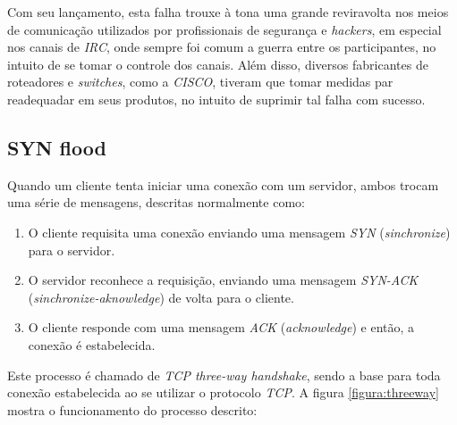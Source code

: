 Com seu lançamento, esta falha trouxe à tona uma grande reviravolta nos meios de comunicação utilizados por profissionais de segurança e \textit{hackers}, em especial nos canais de \textit{IRC}, onde sempre foi comum a guerra entre os participantes, no intuito de se tomar o controle dos canais. Além disso, diversos fabricantes de roteadores e \textit{switches}, como a \textit{CISCO}, tiveram que tomar medidas par readequadar em seus produtos, no intuito de suprimir tal falha com sucesso. \cite{LandExperiences}


\subsection{SYN flood}


Quando um cliente tenta iniciar uma conexão com um servidor, ambos trocam uma série de mensagens, descritas normalmente como:

\begin{enumerate}
    \item O cliente requisita uma conexão enviando uma mensagem \textit{SYN} (\textit{sinchronize}) para o servidor.

    \item O servidor reconhece a requisição, enviando uma mensagem \textit{SYN-ACK} (\textit{sinchronize-aknowledge}) de volta para o cliente.

    \item O cliente responde com uma mensagem \textit{ACK} (\textit{acknowledge}) e então, a conexão é estabelecida.
\end{enumerate}

Este processo é chamado de \textit{TCP three-way handshake}, sendo a base para toda conexão estabelecida ao se utilizar o protocolo \textit{TCP}. A figura \ref{figura:threeway} mostra o funcionamento do processo descrito:

